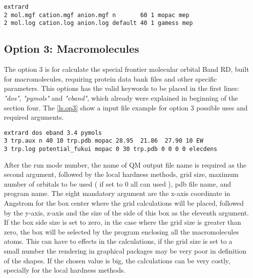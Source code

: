 \documentclass[a4paper,11pt]{refart}
\begin{document}
\hspace*{-\leftmarginwidth}
\begin{minipage}{\fullwidth}
\begin{lstlisting}[caption=Example of input for reactivity descriptor calculations using Finite Difference Approximations.]
extrard 
2 mol.mgf cation.mgf anion.mgf n       60 1 mopac mep 
2 mol.log cation.log anion.log default 40 1 gamess mep
\end{lstlisting}
\end{minipage}

\subsection{Option 3: Macromolecules}

The option 3 is for calculate the special frontier molecular orbital Band RD, built for macromolecules, requiring   protein data bank files and other specific parameters. This options has the valid keywords to be placed in the first lines: \emph{"dos"}, \emph{"pymols"} and \emph{"eband"}, which already were explained in beginning of the section four. The \autoref{ls.op3} show a input file example for option 3 possible uses and required arguments.

\hspace*{-\leftmarginwidth}
\begin{minipage}{\fullwidth}
\begin{lstlisting}[caption=Example of input for reactivity descriptor calculations using Frozen Orbital Approximations for Macromolecules.,label={ls.op3}]
extrard dos eband 3.4 pymols
3 trp.aux n 40 10 trp.pdb mopac 28.95  21.86  27.90 10 EW
3 trp.log potential_fukui mopac 0 30 trp.pdb 0 0 0 0 elecdens
\end{lstlisting}
\end{minipage}


After the run mode number, the name of QM output file name is required as the second argument, followed by the local hardness methods, grid size, maximum number of orbitals to be used ( if set to 0 all can used ), pdb file name, and program name. The eight mandatory argument are the x-axis coordinate in Angstrom for the box center where the grid calculations will be placed, followed by the y-axis, z-axis and the size of the side of this box as the eleventh argument. If the box side size is set to zero, in the case where the grid size is greater than zero, the box will be selected by the program enclosing all the macromolecules atoms. This can have to effects in the calculations, if the grid size is set to a small number the rendering in graphical packages may be very poor in definition of the shapes. If the chosen value is big, the calculations can be very costly, specially for the local hardness methods. 
\end{document}
